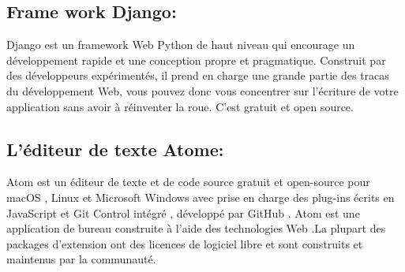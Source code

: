 \documentclass[a4paper]{report}
\begin{document}
\begin{doublespace}
\begin{doublespace}
\begin{doublespace}
\begin{doublespace}
\begin{doublespace}
\begin{doublespace}
                        \newpage

                        \subsection{Frame work Django:}
                        \begin{figure}[H]
                            \raggedleft{
                            }
                        \end{figure}
                        Django est un framework Web Python de haut niveau qui encourage un développement rapide et une conception propre et pragmatique. Construit par des développeurs expérimentés, il prend en charge une grande partie des tracas du développement Web, vous pouvez donc vous concentrer sur l'écriture de votre application sans avoir à réinventer la roue. C'est gratuit et open source.

                        \subsection{L'éditeur de texte Atome:}
                        \begin{figure}[H]
                            \raggedleft{
                            }
                        \end{figure}
                        Atom est un éditeur de texte et de code source gratuit et open-source pour macOS , Linux et Microsoft Windows avec prise en charge des plug-ins écrits en JavaScript et Git Control intégré , développé par GitHub . Atom est une application de bureau construite à l'aide des technologies Web .La plupart des packages d'extension ont des licences de logiciel libre et sont construits et maintenus par la communauté.
                        \newpage

\end{doublespace}
\end{doublespace}
\end{doublespace}
\end{doublespace}
\end{doublespace}
\end{doublespace}
\end{document}
